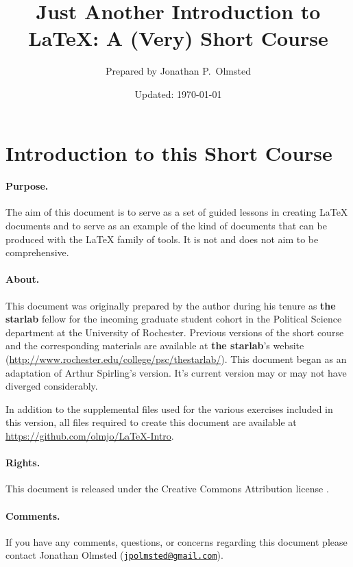 \documentclass[10pt,letterpaper]{article}
\author{Prepared by Jonathan P.\ Olmsted}
\title{Just Another Introduction to \LaTeX{}: A (Very) Short Course}
\date{Updated: \today}
\newcommand{\tsl}{\textbf{\textsf{the starlab}}}
\begin{document}
\begin{titlepage}
  \maketitle
\end{titlepage}

\section*{Introduction to this Short Course}

\paragraph{Purpose.} The aim of this document is to serve as a set of guided
lessons in creating \LaTeX{} documents and to serve as an example of the kind of
documents that can be produced with the \LaTeX{} family of tools. It is not and
does not aim to be comprehensive.

\paragraph{About.} This document was originally prepared by the author during
his tenure as \tsl{} fellow for the incoming graduate student cohort in the
Political Science department at the University of Rochester. Previous versions
of the short course and the corresponding materials are available at \tsl{}'s
website (\url{http://www.rochester.edu/college/psc/thestarlab/}). This document
began as an adaptation of Arthur Spirling's version. It's current version may or
may not have diverged considerably.

In addition to the supplemental files used for the various exercises included in
this version, all files required to create this document are available at
\url{https://github.com/olmjo/LaTeX-Intro}.

\paragraph{Rights.}This document is released under the Creative
Commons Attribution license \by{}.

\paragraph{Comments.}If you have any comments, questions, or concerns regarding
this document please contact Jonathan Olmsted
(\href{mailto:jpolmsted@gmail.com}{\texttt{jpolmsted@gmail.com}}).
\end{document}
